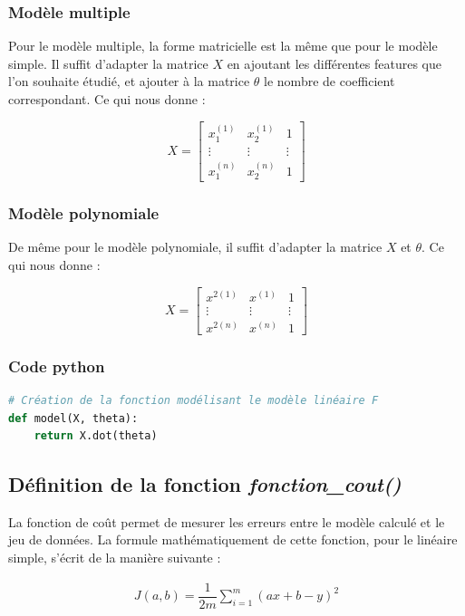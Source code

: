 \documentclass[french]{article}
\begin{document}
\subsubsection{Modèle multiple}

Pour le modèle multiple, la forme matricielle est la même que pour le modèle simple. Il suffit d'adapter la matrice $X$ en ajoutant les différentes features que l'on souhaite étudié, et ajouter à la matrice $\theta$ le nombre de coefficient correspondant. Ce qui nous donne :

$$X = \begin{bmatrix}
    x_{1}^{(1)} & x_{2}^{(1)} & 1 \\
    \vdots & \vdots & \vdots\\
    x_{1}^{(n)} & x_{2}^{(n)} & 1
\end{bmatrix}$$

\subsubsection{Modèle polynomiale}

De même pour le modèle polynomiale, il suffit d'adapter la matrice $X$ et $\theta$. Ce qui nous donne :

$$X = \begin{bmatrix}
    x^{2 (1)} & x^{(1)} & 1 \\
    \vdots & \vdots & \vdots \\
    x^{2 (n)} & x^{(n)} & 1
\end{bmatrix}$$

\subsubsection{Code python}

\begin{lstlisting}[language=Python]
# Création de la fonction modélisant le modèle linéaire F
def model(X, theta):
    return X.dot(theta)
\end{lstlisting}

\subsection{Définition de la fonction \textit{fonction\_cout()}}
La fonction de coût permet de mesurer les erreurs entre le modèle calculé et le jeu de données. La formule mathématiquement de cette fonction, pour le linéaire simple, s'écrit de la manière suivante : 

\begin{align*}
    J(a,b) = \dfrac{1}{2m}\sum_{i=1}^{m}(ax + b - y)^2
\end{align*}
\end{document}
